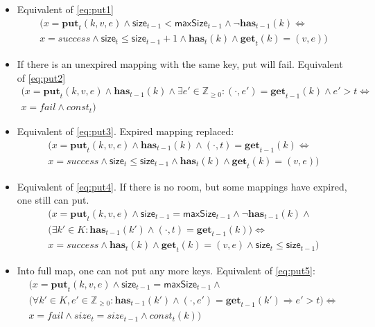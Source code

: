 \documentclass{article}
\renewcommand{\o}[1]{\ensuremath{\mathbf{#1}}}
\newcommand{\p}[1]{\ensuremath{\mathit{#1}}}
\newcommand{\s}[1]{\ensuremath{\mathsf{#1}}}
\newcommand{\nintset}{\ensuremath{\mathds{Z}_{\ge 0}}}
\begin{document}
\begin{itemize}
\item Equivalent of \eqref{eq:put1}
  \begin{gather*}
    \Big(x=\o{put}_t(k, v, e) \wedge \s{size}_{t-1} < \s{maxSize}_{t-1} \wedge \neg\o{has}_{t-1}(k) \Leftrightarrow \nonumber\\
    x=success \wedge \s{size}_t \le \s{size}_{t-1}+1 \wedge \o{has}_t(k)\wedge\o{get}_t(k) = (v, e)\Big)
  \end{gather*}

\item If there is an unexpired mapping with the same key, put will fail. Equivalent of \eqref{eq:put2}
  \begin{gather*}
    \Big(x=\o{put}_t(k, v, e) \wedge \o{has}_{t-1}(k) \wedge \exists e'\in \nintset: (\cdot, e')=\o{get}_{t-1}(k) \wedge e' > t \Leftrightarrow\\
    x=fail \wedge \p{const}_t\Big)
  \end{gather*}

\item Equivalent of \eqref{eq:put3}. Expired mapping replaced:
  \begin{gather*}
    \Big(x=\o{put}_t(k, v, e) \wedge \o{has}_{t-1}(k) \wedge (\cdot, t)=\o{get}_{t-1}(k) \Leftrightarrow\\
    x=success \wedge \s{size}_t \le \s{size}_{t-1} \wedge \o{has}_t(k)\wedge\o{get}_t(k) = (v, e)\Big)
  \end{gather*}

\item Equivalent of \eqref{eq:put4}. If there is no room, but some mappings have expired, one still can put.
  \begin{gather*}
    \Big(x=\o{put}_t(k, v, e) \wedge \s{size}_{t-1} = \s{maxSize}_{t-1} \wedge \neg\o{has}_{t-1}(k) \wedge\\
    \big(\exists k'\in K: \o{has}_{t-1}(k')\wedge (\cdot,t)=\o{get}_{t-1}(k) \big) \Leftrightarrow\\
    x=success \wedge \o{has}_t(k)\wedge\o{get}_t(k) = (v, e) \wedge \s{size}_t \le \s{size}_{t-1}\Big)
\end{gather*}

\item Into full map, one can not put any more keys. Equivalent of \eqref{eq:put5}:
  \begin{gather*}
    \Big(x=\o{put}_t(k, v, e) \wedge \s{size}_{t-1} = \s{maxSize}_{t-1} \wedge  \\
    \big(\forall k'\in K,e'\in \nintset :\o{has}_{t-1}(k')\wedge(\cdot,e')=\o{get}_{t-1}(k') \Rightarrow e' > t \big) \Leftrightarrow\\
    x=fail \wedge size_t = size_{t-1} \wedge \p{const}_t(k)\Big)
  \end{gather*}


\end{itemize}
\end{document}
